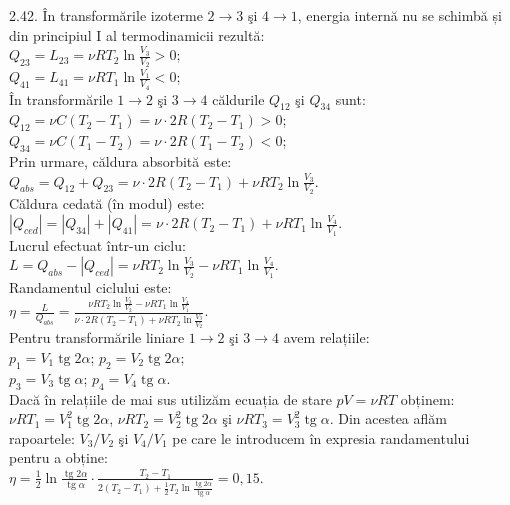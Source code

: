 2.42. În transformările izoterme $2 \rightarrow 3$ şi $4 \rightarrow 1$, energia internă nu se schimbă și din principiul I al termodinamicii rezultă:\\ $Q_{23}=L_{23}=\nu R T_{2} \ln \frac{V_{3}}{V_{2}}>0$;\\ $Q_{41}=L_{41}=\nu R T_{1} \ln \frac{V_{1}}{V_{4}}<0$;\\ În transformările $1 \rightarrow 2$ şi $3 \rightarrow 4$ căldurile $Q_{12}$ şi $Q_{34}$ sunt:\\ $Q_{12}=\nu C\left(T_{2}-T_{1}\right)=\nu \cdot 2 R\left(T_{2}-T_{1}\right)>0$;\\ $Q_{34}=\nu C\left(T_{1}-T_{2}\right)=\nu \cdot 2 R\left(T_{1}-T_{2}\right)<0$;\\ Prin urmare, căldura absorbită este:\\ $Q_{abs}=Q_{12}+Q_{23}=\nu \cdot 2 R\left(T_{2}-T_{1}\right)+\nu R T_{2} \ln \frac{V_{3}}{V_{2}}$.\\ Căldura cedată (în modul) este:\\ $\left|Q_{ced}\right|=\left|Q_{34}\right|+\left|Q_{41}\right|=\nu \cdot 2 R\left(T_{2}-T_{1}\right)+\nu R T_{1} \ln \frac{V_{4}}{V_{1}}$.\\ Lucrul efectuat într-un ciclu:\\ $L=Q_{abs}-\left|Q_{ced}\right|=\nu R T_{2} \ln \frac{V_{3}}{V_{2}}-\nu R T_{1} \ln \frac{V_{4}}{V_{1}}$.\\ Randamentul ciclului este:\\ $\eta=\frac{L}{Q_{abs}}=\frac{\nu R T_{2} \ln \frac{V_{3}}{V_{2}}-\nu R T_{1} \ln \frac{V_{4}}{V_{1}}}{\nu \cdot 2 R\left(T_{2}-T_{1}\right)+\nu R T_{2} \ln \frac{V_{3}}{V_{2}}}$.\\ Pentru transformările liniare $1 \rightarrow 2$ şi $3 \rightarrow 4$ avem relațiile:\\ $p_{1}=V_{1} \operatorname{tg} 2 \alpha$; \quad $p_{2}=V_{2} \operatorname{tg} 2 \alpha$;\\ $p_{3}=V_{3} \operatorname{tg} \alpha$; \quad $p_{4}=V_{4} \operatorname{tg} \alpha$.\\ Dacă în relațiile de mai sus utilizăm ecuația de stare $p V=\nu R T$ obținem: $\nu R T_{1}=V_{1}^{2} \operatorname{tg} 2 \alpha$, $\nu R T_{2}=V_{2}^{2} \operatorname{tg} 2 \alpha$ şi $\nu R T_{3}=V_{3}^{2} \operatorname{tg} \alpha$. Din acestea aflăm rapoartele: $V_{3} / V_{2}$ şi $V_{4} / V_{1}$ pe care le introducem în expresia randamentului pentru a obține:\\ $\eta=\frac{1}{2} \ln \frac{\operatorname{tg} 2 \alpha}{\operatorname{tg} \alpha} \cdot \frac{T_{2}-T_{1}}{2\left(T_{2}-T_{1}\right)+\frac{1}{2} T_{2} \ln \frac{\operatorname{tg} 2 \alpha}{\operatorname{tg} \alpha}}=0,15$.\\

